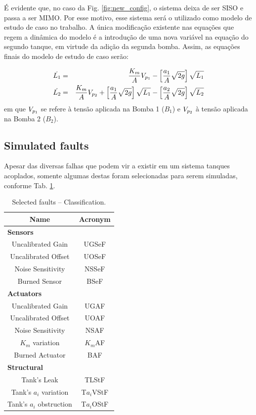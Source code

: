 \documentclass[10pt,fleqn,a4paper]{article}
\begin{document}
É evidente que, no caso da Fig. \ref{fig:new_config}, o sistema deixa de ser
SISO e passa a ser MIMO. Por esse motivo, esse sistema será o utilizado como
modelo de estudo de caso no trabalho. A única modificação existente nas equações
que regem a dinâmica do modelo é a introdução de uma nova variável na equação do
segundo tanque, em virtude da adição da segunda bomba. Assim, as equações finais
do modelo de estudo de caso serão:

\begin{eqnarray}
\dot{L_1} & = & \frac{K_m}{A}V_{p_{\tiny 1}} -
                \left[\frac{a_1}{A}\sqrt{2g}\right]\sqrt{L_1}
                \label{eq:l1_ponto_fin}\\
\dot{L_2} & = & \frac{K_m}{A}V_{p_{\tiny 2}} +
                \left[\frac{a_1}{A}\sqrt{2g}\right]\sqrt{L_1} -
                \left[\frac{a_2}{A}\sqrt{2g}\right]\sqrt{L_2}
                \label{eq:l2_ponto_fin}
\end{eqnarray}
%
em que $V_{p_{\tiny 1}}$ se refere à tensão aplicada na Bomba 1 ($B_1$) e
$V_{p_{\tiny 2}}$ à tensão aplicada na Bomba 2 ($B_2$).

\subsection{Simulated faults}
Apesar das diversas falhas que podem vir a existir em um sistema tanques
acoplados, somente algumas destas foram selecionadas para serem simuladas,
conforme Tab. \ref{tab:faults}.

\begin{table}[!htb]
\centering
\caption{Selected faults -- Classification.}
\label{tab:faults}
\begin{tabular}{|c|c|}
\hline
{\bf Name} & {\bf Acronym}\\
\hline
\multicolumn{2}{|l|}{\bf Sensors}\\
\hline
Uncalibrated Gain & UGSeF\\
\hline
Uncalibrated Offset & UOSeF\\
\hline
Noise Sensitivity & NSSeF\\
\hline
Burned Sensor & BSeF\\
\hline
\multicolumn{2}{|l|}{\bf Actuators}\\
\hline
Uncalibrated Gain & UGAF\\
\hline
Uncalibrated Offset & UOAF\\
\hline
Noise Sensitivity & NSAF\\
\hline
$K_m$ variation & $K_m$AF\\
\hline
Burned Actuator & BAF\\
\hline
\multicolumn{2}{|l|}{\bf Structural}\\
\hline
Tank's Leak & TLStF\\
\hline
Tank's $a_i$ variation & T$a_i$VStF\\
\hline
Tank's $a_i$ obstruction & T$a_i$OStF\\
\hline
\end{tabular}
\end{table}
\end{document}
